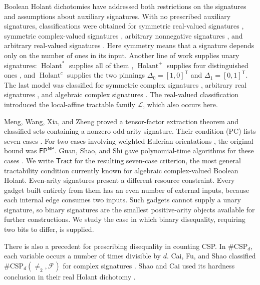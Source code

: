 \documentclass[11pt,letterpaper,onecolumn]{article}
\theoremstyle{plain}
\theoremstyle{definition}
\theoremstyle{remark}
\newcommand{\cF}{\mathcal F}
\newcommand{\cL}{\mathscr L}
\newcommand{\Holant}{\operatorname{Holant}}
\newcommand{\Tract}{\mathsf{Tract}}
\newcommand{\FP}{\mathsf{FP}}
\newcommand{\Neq}{\neq}
\newcommand{\DeltaZero}{\Delta_0}
\newcommand{\DeltaOne}{\Delta_1}
\begin{document}
Boolean Holant dichotomies have addressed both restrictions on the
signatures and assumptions about auxiliary signatures.  With no prescribed
auxiliary signatures, classifications were obtained for symmetric
real-valued signatures \cite{HuangLu2016}, symmetric complex-valued
signatures \cite{CaiGuoWilliams2016}, arbitrary nonnegative signatures
\cite{LinWang2018}, and arbitrary real-valued signatures
\cite{ShaoCai2020}.  Here symmetry means that a signature depends only on
the number of ones in its input.  Another line of work supplies unary
signatures: \(\Holant^*\) supplies all of them
\cite{CaiLuXia2011HolantStar}, \(\Holant^+\) supplies four distinguished
ones \cite{Backens2017}, and \(\Holant^c\) supplies the two pinnings
\(\DeltaZero=[1,0]^{\mathsf T}\) and
\(\DeltaOne=[0,1]^{\mathsf T}\).
The last model was classified for symmetric complex signatures
\cite{CaiHuangLu2012Holantc}, arbitrary real signatures
\cite{CaiLuXia2018RealHolantc}, and algebraic complex signatures
\cite{Backens2021,Backens2025}.  The real-valued classification introduced
the local-affine tractable family \(\cL\), which also occurs here.

Meng, Wang, Xia, and Zheng proved a tensor-factor extraction theorem and
classified sets containing a nonzero odd-arity signature. Their condition
(PC) lists seven cases \cite[conference version, Theorem~30]{MengWangXiaZheng2025}.
For two cases involving weighted Eulerian orientations
\cite{MengWangXia2025EO}, the original bound was \(\FP^{\mathsf{NP}}\).
Guan, Shao, and Shi gave polynomial-time algorithms for these cases
\cite{GuanShaoShi2026}. We write \(\Tract\) for the resulting seven-case
criterion, the most general tractability condition currently known for
algebraic complex-valued Boolean Holant.
Even-arity signatures present a different resource constraint.  Every
gadget built entirely from them has an even number of external inputs,
because each internal edge consumes two inputs.  Such gadgets cannot
supply a unary signature, so binary signatures are the smallest
positive-arity objects available for further constructions.  We study
the case in which binary disequality, requiring two bits to differ, is
supplied.

There is also a precedent for prescribing disequality in counting CSP.
In \(\#\mathrm{CSP}_d\), each variable occurs a number of times divisible
by \(d\).  Cai, Fu, and Shao classified
\(\#\mathrm{CSP}_d(\Neq_2,\cF)\) for complex signatures
\cite[full version, Section~5.1 and Theorem~5.3]{CaiFuShao2020Entanglement}.
Shao and Cai used its hardness conclusion in their real Holant dichotomy
\cite[full version, Theorem~2.24]{ShaoCai2020}.
\end{document}
